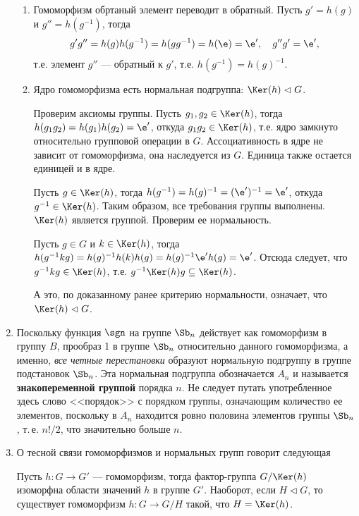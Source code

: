 \begin{enumerate}
\begin{enumerate}[\bf Hom1]
\item Гомоморфизм обртаный элемент переводит в обратный. Пусть $g'=h(g)$ и $g''=h(g^{-1})$, тогда
$$
g'g'' = h(g)h(g^{-1})=h(gg^{-1})=h(\e)=\e',\quad g''g'=\e',
$$
т.е. элемент $g''$ --- обратный к $g'$, т.е. $h(g^{-1})=h(g)^{-1}$.

\item Ядро гомоморфизма есть нормальная подгруппа: $\Ker(h)\vartriangleleft G$.

Проверим аксиомы группы. Пусть $g_1, g_2\in \Ker(h)$, тогда $h(g_1g_2)=h(g_1)h(g_2)=\e'$, откуда $g_1g_2\in\Ker(h)$, т.е. ядро замкнуто относительно групповой операции в $G$. Ассоциативность в ядре не зависит от гомоморфизма, она наследуется из $G$. Единица также остается единицей и в ядре.

Пусть $g\in\Ker(h)$, тогда $h(g^{-1})=h(g)^{-1}=(\e')^{-1}=\e'$, откуда $g^{-1}\in\Ker(h)$. Таким образом, все требования группы выполнены. $\Ker(h)$ является группой. Проверим ее нормальность.

Пусть $g\in G$ и $k\in\Ker(h)$, тогда $h(g^{-1}kg)=h(g)^{-1}h(k)h(g)=h(g)^{-1}\e'h(g)=\e'$. Отсюда следует, что $g^{-1}kg\in\Ker(h)$, т.е. $g^{-1}\Ker(h)g\subseteq \Ker(h)$.

А это, по доказанному ранее критерию нормальности, означает, что $\Ker(h)\vartriangleleft G$.

\end{enumerate}

\item Поскольку функция $\sgn$ на группе $\Sb_n$ действует как гомоморфизм в группу $B$, прообраз 1 в группе $\Sb_n$ относительно данного гомоморфизма, а именно, \textit{все четные перестановки} образуют нормальную подгруппу в группе подстановок $\Sb_n$. Эта нормальная подгруппа обозначается $A_n$ и называется \textbf{знакопеременной группой} порядка $n$. Не следует путать употребленное здесь слово <<порядок>> с порядком группы, означающим количество ее элементов, поскольку в $A_n$ находится ровно половина элементов группы $\Sb_n$, т.\,е. $n!/2$, что значительно больше $n$.

\item О тесной связи гомоморфизмов и нормальных групп говорит следующая

\begin{thrm}
Пусть $h:G\to G'$ --- гомоморфизм, тогда
фактор-группа $G/\Ker(h)$ изоморфна области значений $h$ в группе $G'$. Наоборот, если $H\vartriangleleft G$, то существует гомоморфизм $h:G\to G/H$ такой, что $H=\Ker(h)$.
\end{thrm}
\end{enumerate}
